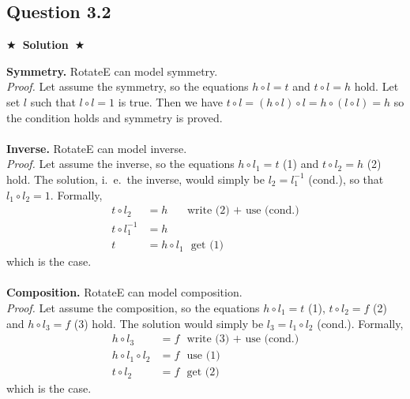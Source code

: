 \documentclass{article}
\newcommand{\Solution}[1]{{\medskip \color{black} \bf $\bigstar$~\sf \textbf{Solution}~$\bigstar$ \sf #1 } \bigskip}
\begin{document}
\subsection*{Question 3.2}
\Solution{

  \noindent
  \textbf{Symmetry.} RotateE can model symmetry.
  \\
  \textit{Proof.} Let assume the symmetry, so the equations $h \circ l = t$ and $t \circ l = h$ hold. Let set $l$ such that $l \circ l = 1$ is true.
  Then we have $ t \circ l = (h \circ l) \circ l = h \circ (l \circ l) = h$ so the condition holds and symmetry is proved.
  \\
  \\
  \textbf{Inverse.} RotateE can model inverse.
  \\
  \textit{Proof.} Let assume the inverse, so the equations $h \circ l_1 = t$ (1) and $t \circ l_2 = h$ (2) hold. The solution, i.~e.~the inverse, 
  would simply be $l_2 = l_1^{-1}$ (cond.), so that $l_1 \circ l_2 = 1$. Formally,
  \begin{align*}
    t \circ l_2 &= h \ \ \ \ \ \ \ \ \text{write (2) + use (cond.)}
    \\
    t \circ l_1^{-1} &= h 
    \\
    t &= h \circ l_1 \ \ \ \text{get (1)}
  \end{align*}
  which is the case.
  \\
  \\
  \textbf{Composition.} RotateE can model composition.
  \\
  \textit{Proof.} Let assume the composition, so the equations $h \circ l_1 = t$ (1), $t \circ l_2 = f$ (2) and $h \circ l_3 = f$ (3) hold. 
  The solution would simply be $l_3 = l_1 \circ l_2$ (cond.). Formally,
  \begin{align*}
    h \circ l_3 &= f \ \ \ \text{write (3) + use (cond.)}
    \\
    h \circ l_1 \circ l_2 &= f \ \ \ \text{use (1)}
    \\
    t \circ l_2 &= f \ \ \ \text{get (2)}
  \end{align*}
  which is the case.
  }

\end{document}
